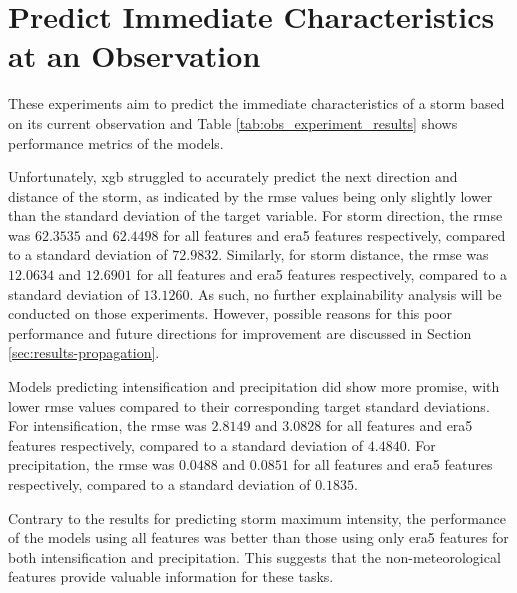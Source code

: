 \clearpage
\section{Predict Immediate Characteristics at an Observation}

These experiments aim to predict the immediate characteristics of a storm based on its current observation and Table \ref{tab:obs_experiment_results} shows performance metrics of the models. 

Unfortunately, \acrshort{xgb} struggled to accurately predict the next direction and distance of the storm, as indicated by the \acrshort{rmse} values being only slightly lower than the standard deviation of the target variable. For storm direction, the \acrshort{rmse} was $62.3535$ and $62.4498$ for all features and \acrshort{era5} features respectively, compared to a standard deviation of $72.9832$. Similarly, for storm distance, the \acrshort{rmse} was $12.0634$ and $12.6901$ for all features and \acrshort{era5} features respectively, compared to a standard deviation of $13.1260$. As such, no further explainability analysis will be conducted on those experiments. However, possible reasons for this poor performance and future directions for improvement are discussed in Section \ref{sec:results-propagation}.

Models predicting intensification and precipitation did show more promise, with lower \acrshort{rmse} values compared to their corresponding target standard deviations. For intensification, the \acrshort{rmse} was $2.8149$ and $3.0828$ for all features and \acrshort{era5} features respectively, compared to a standard deviation of $4.4840$. For precipitation, the \acrshort{rmse} was $0.0488$ and $0.0851$ for all features and \acrshort{era5} features respectively, compared to a standard deviation of $0.1835$.

Contrary to the results for predicting storm maximum intensity, the performance of the models using all features was better than those using only \acrshort{era5} features for both intensification and precipitation. This suggests that the non-meteorological features provide valuable information for these tasks.


